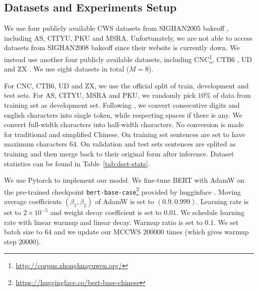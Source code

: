\documentclass[11pt]{article}
\begin{document}
\subsection{Datasets and Experiments Setup}\label{sec:hps}

We use four publicly available CWS datasets from SIGHAN2005 bakeoff \citep{emerson-2005-second}, including AS, CITYU, PKU and MSRA.
Unfortunately, we are not able to access datasets from SIGHAN2008 bakeoff \citep{jin-chen-2008-fourth} since their website is currently down.
We instead use another four publicly available datasets, including CNC\footnote{\url{http://corpus.zhonghuayuwen.org/}}, CTB6 \citep{xue-2015-ctb}, UD \citep{zeman-etal-2018-conll} and ZX \citep{zhang-etal-2014-type}.
We use eight datasets in total (\(M = 8\)).

For CNC, CTB6, UD and ZX, we use the official split of train, development and test sets.
For AS, CITYU, MSRA and PKU, we randomly pick \(10\%\) of data from training set as development set.
Following \citep{cai-etal-2017-fast}, we convert consecutive digits and english characters into single token, while respecting spaces if there is any.
We convert full-width characters into half-width characters.
No conversion is made for traditional and simplified Chinese.
On training set sentences are set to have maximum characters \(64\).
On validation and test sets sentences are splited as training and then merge back to their original form after inference.
Dataset statistics can be found in Table~\ref{tab:dset-stats}.

We use Pytorch \citep{paszke-etal-2019-pytorch} to implement our model.
We fine-tune BERT with AdamW \citep{loshchilov2018decoupled} on the pre-trained checkpoint \texttt{bert-base-case}\footnote{\url{https://huggingface.co/bert-base-chinese}} provided by hugginface \citep{wolf2019huggingface}.
Moving average coefficients \((\beta_1, \beta_2)\) of AdamW is set to \((0.9, 0.999)\).
Learning rate is set to \(2 \times 10^{-5}\) and weight decay coefficient is set to \(0.01\).
We schedule learning rate with linear warmup and linear decay.
Warmup ratio is set to \(0.1\).
We set batch size to \(64\) and we update our MCCWS \(200000\) times (which gives warmup step \(20000\)).
\end{document}
